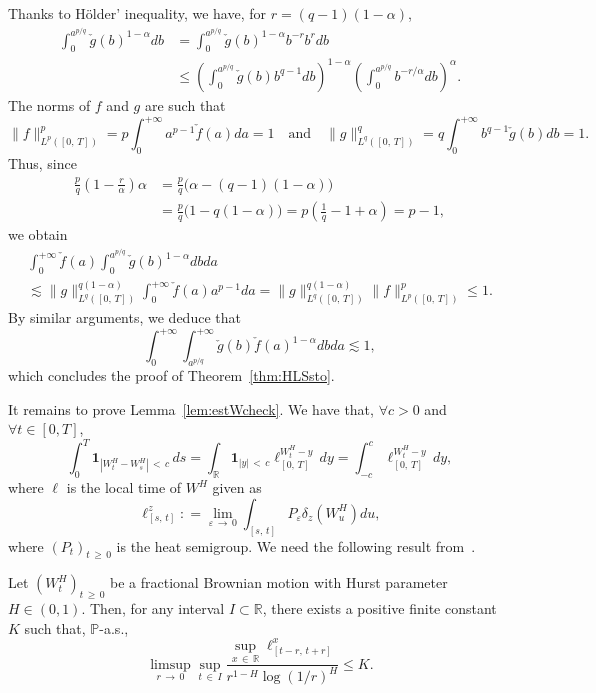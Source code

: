 \documentclass[AHL,Unicode,longabstracts,published]{cedram}
\newcommand{\bbP}{\mathbb{P}}
\newcommand{\bbR}{\mathbb{R}}
\newcommand{\bfun}{\mathbf{1}}
\let\oldforall\forall
\renewcommand*{\forall}{\mathrel{\oldforall}}
\begin{document}
Thanks to H\"older' inequality, we have, for $r = (q-1)(1-\alpha)$,
\begin{align*}
\int_0^{a^{p/q}}\check{g}(b)^{1-\alpha}db &= \int_0^{a^{p/q}}\check{g}(b)^{1-\alpha}b^{-r}b^{r}db
\\ &\leq \left(\int_0^{a^{p/q}}\check{g}(b) b^{q-1}db \right)^{1-\alpha}\left(\int_0^{a^{p/q}} b^{-r/\alpha}db\right)^{\alpha}.
\end{align*}
The norms of $f$ and $g$ are such that
\[
\|f\|_{L^p\left([0,\,T]\right)}^p = p\int_0^{+\infty} a^{p-1} \check{f}(a)da = 1\quad\text{and}\quad \|g\|_{L^q\left([0,\,T]\right)}^q = q\int_0^{+\infty} b^{q-1} \check{g}(b)db = 1.
\]
Thus, since
\begin{align*}
\frac pq\left(1-\frac{r}{\alpha}\right)\alpha &= \frac pq\big(\alpha - (q-1)\left(1-\alpha\right)\big)
\\ &=\frac pq\big(1 - q\left(1-\alpha\right)\big) = p\left(\frac1q - 1 + \alpha\right) = p - 1,
\end{align*}
we obtain
\begin{multline*}
\int_0^{+\infty}\check{f}(a)\int_0^{a^{p/q}}\check{g}(b)^{1-\alpha}db da\\ \lesssim \|g\|_{L^q\left([0,\,T]\right)}^{q(1-\alpha)}\int_{0}^{+\infty}\check{f}(a)a^{p-1}da = \|g\|_{L^q\left([0,\,T]\right)}^{q(1-\alpha)}\|f\|_{L^p\left([0,\,T]\right)}^p\leq 1.
\end{multline*}
By similar arguments, we deduce that
\[
\int_0^{+\infty}\int_{a^{p/q}}^{+\infty} \check{g}(b)\check{f}(a)^{1-\alpha} db da \lesssim 1,
\]
which concludes the proof of Theorem~\ref{thm:HLSsto}.


It remains to prove Lemma~\ref{lem:estWcheck}. We have that, $\forall c>0$ and $\forall t\in [0,T]$,
\[
\int_0^T \bfun_{\left|W_t^H-W_s^H\right|\,<\,c}\,ds = \int_{\bbR} \bfun_{|y|\,<\,c} \ell^{W_t^H-y}_{[0,\,T]}\,dy = \int_{-c}^{c} \ell^{W_t^H-y}_{[0,\,T]}\,dy,
\]
where $\ell$ is the local time of $W^H$ given as
\[
\ell^z_{[s,\,t]} : = \lim_{\varepsilon\,\to\,0}\int_{[s,\,t]} P_{\varepsilon} \delta_z\left(W^H_u\right)du,
\]
where $(P_{t})_{t\,\geq\,0}$ is the heat semigroup. We need the following result from~\cite{xiao1997holder}.

\begin{theo}\label{thm:LTHolder}
Let $(W^H_t)_{t\,\geq\,0}$ be a fractional Brownian motion with Hurst parameter $H\in(0,1)$. Then, for any interval $I\subset \bbR$, there exists a positive finite constant $K$ such that, $\bbP$-a.s.,
\[
\underset{r\,\to\,0}{\limsup} \sup_{t\,\in\,I} \frac{\sup_{x\,\in\,\bbR}\ell^x_{\left[t-r,\,t+r\right]}}{r^{1-H}\log(1/r)^H}\leq K.
\]
\end{theo}
\end{document}
